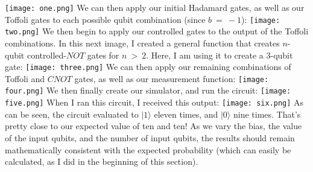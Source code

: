 \documentclass{article}
\begin{document}
\newline\newline
\texttt{[image: one.png]}
\newline\newline
We can then apply our initial Hadamard gates, as well as our Toffoli gates to each possible qubit combination (since $b \ = \ -1$):
\newline\newline
\texttt{[image: two.png]}
\newline\newline
We then begin to apply our controlled gates to the output of the Toffoli combinations. In this next image, I created a general function that creates $n$-qubit controlled-$NOT$ gates for $n \ > \ 2$. Here, I am using it to create a $3$-qubit gate:
\newline\newline
\texttt{[image: three.png]}
\newline\newline
We can then apply our remaining combinations of Toffoli and $CNOT$ gates, as well as our measurement function:
\newline\newline
\texttt{[image: four.png]}
\newline\newline
We then finally create our simulator, and run the circuit:
\newline\newline
\texttt{[image: five.png]}
\newline\newline
When I ran this circuit, I received this output:
\newline\newline
\texttt{[image: six.png]}
\newline\newline
As can be seen, the circuit evaluated to $|1\rangle$ eleven times, and $|0\rangle$ nine times. That's pretty close to our expected value of ten and ten!
\newline\newline
As we vary the bias, the value of the input qubits, and the number of input qubits, the results should remain mathematically consistent with the expected probability (which can easily be calculated, as I did in the beginning of this section).
\newline\newline
\end{document}
